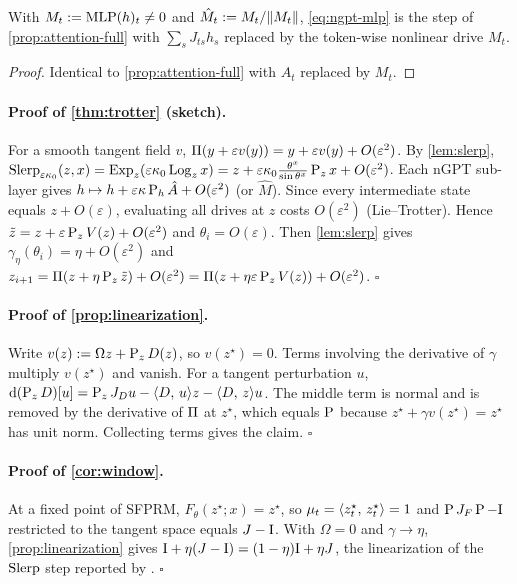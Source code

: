 \begin{proposition}
\label{prop:mlp}
With $M_t:=\operatorname{MLP}(h)_t\neq0$ and $\hat M_t:=M_t/\lVert M_t\rVert$, \eqref{eq:ngpt-mlp} is the step of
\cref{prop:attention-full} with $\sum_sJ_{ts}h_s$ replaced by the token-wise nonlinear drive $M_t$.
\end{proposition}
\begin{proof}
Identical to \cref{prop:attention-full} with $A_t$ replaced by $M_t$.
\end{proof}

\paragraph{Proof of \cref{thm:trotter} (sketch).}
For a smooth tangent field $v$, $\Pi(y+\varepsilon v(y))=y+\varepsilon v(y)+O(\varepsilon^2)$. By
\cref{lem:slerp},
$\operatorname{Slerp}_{\varepsilon\kappa_0}(z,x)=\operatorname{Exp}_z(\varepsilon\kappa_0\operatorname{Log}_zx)=z+\varepsilon\kappa_0\tfrac{\theta^x}{\sin\theta^x}\operatorname{P}_zx+O(\varepsilon^2)$.
Each nGPT sub-layer gives $h\mapsto h+\varepsilon\kappa\operatorname{P}_h\hat A+O(\varepsilon^2)$ (or $\hat M$).
Since every intermediate state equals $z+O(\varepsilon)$, evaluating all drives at $z$ costs
$O(\varepsilon^2)$ (Lie--Trotter). Hence $\tilde z=z+\varepsilon\operatorname{P}_zV(z)+O(\varepsilon^2)$ and
$\theta_i=O(\varepsilon)$. Then \cref{lem:slerp} gives $\gamma_\eta(\theta_i)=\eta+O(\varepsilon^2)$ and
$z_{i+1}=\Pi(z+\eta\operatorname{P}_z\tilde z)+O(\varepsilon^2)=\Pi(z+\eta\varepsilon\operatorname{P}_zV(z))+O(\varepsilon^2)$.
\hfill$\square$

\paragraph{Proof of \cref{prop:linearization}.}
Write $v(z):=\Omega z+\operatorname{P}_zD(z)$, so $v(z^\star)=0$. Terms involving the derivative of $\gamma$
multiply $v(z^\star)$ and vanish. For a tangent perturbation $u$,
$\mathrm d(\operatorname{P}_zD)[u]=\operatorname{P}_zJ_Du-\langle D,\, u\rangle z-\langle D,\, z\rangle u$. The middle term is normal and is removed by
the derivative of $\Pi$ at $z^\star$, which equals $\operatorname{P}$ because $z^\star+\gamma v(z^\star)=z^\star$
has unit norm. Collecting terms gives the claim. \hfill$\square$

\paragraph{Proof of \cref{cor:window}.}
At a fixed point of SFPRM, $F_\theta(z^\star;x)=z^\star$, so $\mu_t=\langle z^\star_t,\, z^\star_t\rangle=1$ and
$\operatorname{P} J_F\operatorname{P}-\mathrm{I}$ restricted to the tangent space equals $J-\mathrm{I}$. With $\Omega=0$ and
$\gamma\to\eta$, \cref{prop:linearization} gives $\mathrm{I}+\eta(J-\mathrm{I})=(1-\eta)\mathrm{I}+\eta J$, the
linearization of the $\operatorname{Slerp}$ step reported by \citet{sfprm}. \hfill$\square$

